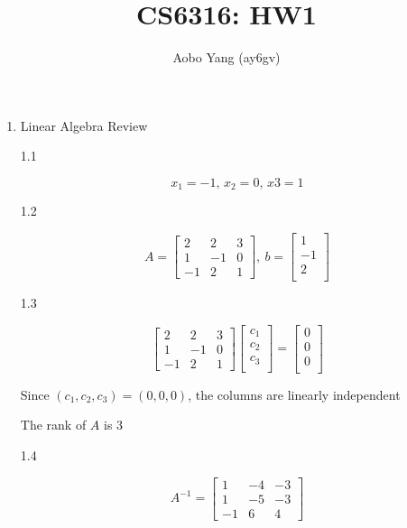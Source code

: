 \documentclass[11pt]{article}
\begin{document}
\author{Aobo Yang (ay6gv)}
\title{CS6316: HW1}
\maketitle

\medskip

\begin{enumerate}

\item
Linear Algebra Review

1.1

$$ x_1=-1,\, x_2=0,\, x3=1 $$

1.2

$$
A = \begin{bmatrix}
    2 & 2 & 3 \\
    1 & -1 & 0 \\
    -1 & 2 & 1
\end{bmatrix},
\:
b = \begin{bmatrix}
    1 \\
    -1 \\
    2 \\
\end{bmatrix}
$$

1.3

$$
\begin{bmatrix}
    2 & 2 & 3 \\
    1 & -1 & 0 \\
    -1 & 2 & 1
\end{bmatrix}\begin{bmatrix}
    c_1 \\
    c_2 \\
    c_3 \\
\end{bmatrix} = \begin{bmatrix}
    0 \\
    0 \\
    0 \\
\end{bmatrix}
$$

Since $(c_1, c_2, c_3) = (0, 0, 0)$, the columns are linearly independent

The rank of $A$ is $3$

1.4

$$
A^{-1} = \begin{bmatrix}
    1 & -4 & -3 \\
    1 & -5 & -3 \\
    -1 & 6 & 4
\end{bmatrix}
$$


\end{enumerate}
\end{document}
